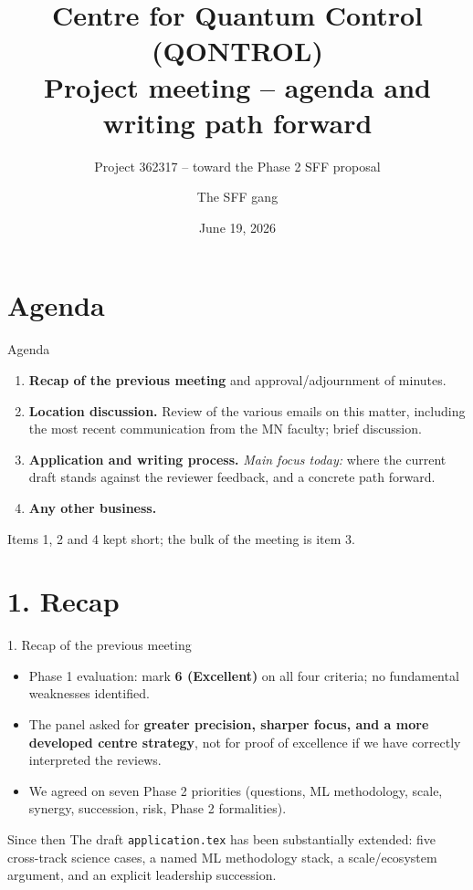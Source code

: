 \documentclass[10pt,aspectratio=169]{beamer}
\title[QONTROL -- Project meeting]{Centre for Quantum Control (QONTROL) \\ \small Project meeting -- agenda and writing path forward}
\subtitle{Project 362317 -- toward the Phase 2 SFF proposal}
\author{The SFF gang}
\institute[UiO]{University of Oslo}
\date{June 19, 2026}
\begin{document}
\begin{frame}
  \titlepage
\end{frame}

\section{Agenda}
\begin{frame}{Agenda}
  \begin{enumerate}
    \item \textbf{Recap of the previous meeting} and approval/adjournment of minutes.
    \vfill
    \item \textbf{Location discussion.} Review of the various emails on this matter,
          including the most recent communication from the MN faculty; brief discussion.
    \vfill
    \item \textbf{Application and writing process.} \emph{Main focus today:} where the
          current draft stands against the reviewer feedback, and a concrete path forward.
    \vfill
    \item \textbf{Any other business.}
  \end{enumerate}
  \vfill
  \begin{center}
    \small Items 1, 2 and 4 kept short; the bulk of the meeting is item 3.
  \end{center}
\end{frame}

\section{1. Recap}
\begin{frame}{1. Recap of the previous meeting}
  \begin{itemize}
    \item Phase 1 evaluation: mark \textbf{6 (Excellent)} on all four criteria; no fundamental
          weaknesses identified.
    \item The panel asked for \textbf{greater precision, sharper focus, and a more developed
          centre strategy}, not for proof of excellence if we have correctly interpreted the reviews.
    \item We agreed on seven Phase 2 priorities (questions, ML methodology, scale, synergy,
          succession, risk, Phase 2 formalities).
  \end{itemize}
  \vfill
  \begin{block}{Since then}
    The draft \texttt{application.tex} has been substantially extended: five cross-track science
    cases, a named ML methodology stack, a scale/ecosystem argument, and an explicit leadership
    succession.
  \end{block}
\end{frame}
\end{document}
